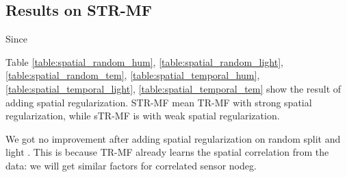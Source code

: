 \subsection{Results on STR-MF} \label{experimental_results_spatial}
Since

Table \ref{table:spatial_random_hum}, \ref{table:spatial_random_light}, \ref{table:spatial_random_tem}, \ref{table:spatial_temporal_hum}, \ref{table:spatial_temporal_light}, \ref{table:spatial_temporal_tem}  show the result of adding spatial regularization. 
STR-MF mean TR-MF with strong spatial regularization, while sTR-MF is with weak spatial regularization.

We got no improvement after adding spatial regularization on random split and light 
. This is because TR-MF already learns the spatial correlation from the data: we will get similar factors for correlated sensor nodeg. 



